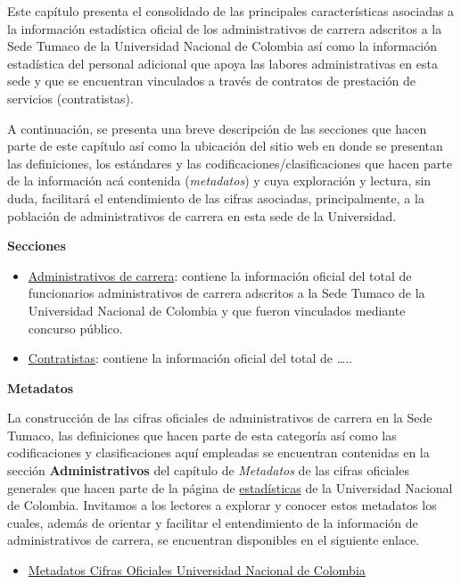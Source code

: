 \documentclass[
]{book}
\providecommand{\tightlist}{%
  \setlength{\itemsep}{0pt}\setlength{\parskip}{0pt}}
\begin{document}
Este capítulo presenta el consolidado de las principales características asociadas a la información estadística oficial de los administrativos de carrera adscritos a la Sede Tumaco de la Universidad Nacional de Colombia así como la información estadística del personal adicional que apoya las labores administrativas en esta sede y que se encuentran vinculados a través de contratos de prestación de servicios (contratistas).

A continuación, se presenta una breve descripción de las secciones que hacen parte de este capítulo así como la ubicación del sitio web en donde se presentan las definiciones, los estándares y las codificaciones/clasificaciones que hacen parte de la información acá contenida (\emph{metadatos}) y cuya exploración y lectura, sin duda, facilitará el entendimiento de las cifras asociadas, principalmente, a la población de administrativos de carrera en esta sede de la Universidad.

\textbf{Secciones}

\begin{itemize}
\item
  \protect\hyperlink{AdmCar}{Administrativos de carrera}: contiene la información oficial del total de funcionarios administrativos de carrera adscritos a la Sede Tumaco de la Universidad Nacional de Colombia y que fueron vinculados mediante concurso público.
\item
  \protect\hyperlink{Contrat}{Contratistas}: contiene la información oficial del total de \ldots..
\end{itemize}

\textbf{Metadatos}

La construcción de las cifras oficiales de administrativos de carrera en la Sede Tumaco, las definiciones que hacen parte de esta categoría así como las codificaciones y clasificaciones aquí empleadas se encuentran contenidas en la sección \textbf{Administrativos} del capítulo de \emph{Metadatos} de las cifras oficiales generales que hacen parte de la página de \href{http://estadisticas.unal.edu.co/home/}{estadísticas} de la Universidad Nacional de Colombia. Invitamos a los lectores a explorar y conocer estos metadatos los cuales, además de orientar y facilitar el entendimiento de la información de administrativos de carrera, se encuentran disponibles en el siguiente enlace.

\begin{itemize}
\tightlist
\item
  \href{http://estadisticas.unal.edu.co/menu-principal/cifras-generales/metadatos/cifras-generales/}{Metadatos Cifras Oficiales Universidad Nacional de Colombia}
\end{itemize}
\end{document}

